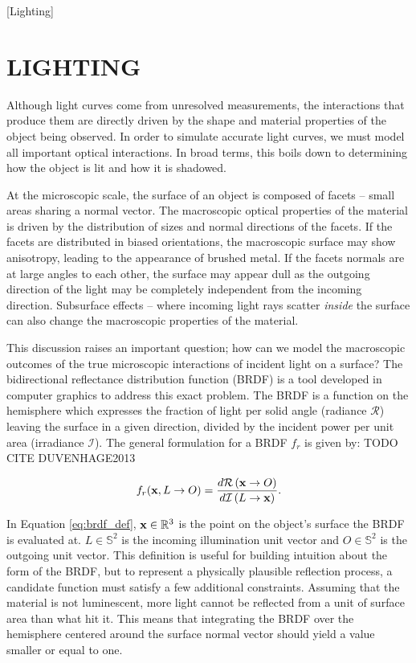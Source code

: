 [Lighting]
\graphicspath{{../PyLightCurves/docs/source/gallery/01-light_curves/images}}

\chapter{LIGHTING}

Although light curves come from unresolved measurements, the interactions that produce them are directly driven by the shape and material properties of the object being observed. In order to simulate accurate light curves, we must model all important optical interactions. In broad terms, this boils down to determining how the object is lit and how it is shadowed. 

At the microscopic scale, the surface of an object is composed of facets -- small areas sharing a normal vector. The macroscopic optical properties of the material is driven by the distribution of sizes and normal directions of the facets. If the facets are distributed in biased orientations, the macroscopic surface may show anisotropy, leading to the appearance of brushed metal. If the facets normals are at large angles to each other, the surface may appear dull as the outgoing direction of the light may be completely independent from the incoming direction. Subsurface effects -- where incoming light rays scatter \textit{inside} the surface can also change the macroscopic properties of the material. 

This discussion raises an important question; how can we model the macroscopic outcomes of the true microscopic interactions of incident light on a surface? The bidirectional reflectance distribution function (BRDF) is a tool developed in computer graphics to address this exact problem. The BRDF is a function on the hemisphere which expresses the fraction of light per solid angle (radiance $\mathcal{R}$) leaving the surface in a given direction, divided by the incident power per unit area (irradiance $\mathcal{I}$). The general formulation for a BRDF $f_r$ is given by: TODO CITE DUVENHAGE2013

\begin{equation}
    f_r(\mathbf{x}, L \rightarrow O) = \frac{d\mathcal{R}\left(\mathbf{x} \rightarrow O\right)}{d\mathcal{I}\left(L \rightarrow \mathbf{x}\right)}.
    \label{eq:brdf_def}
\end{equation}

In Equation \ref{eq:brdf_def}, $\mathbf{x} \in \mathbb{R}^3$ is the point on the object's surface the BRDF is evaluated at. $L \in \mathbb{S}^2$ is the incoming illumination unit vector and $O \in \mathbb{S}^2$ is the outgoing unit vector. This definition is useful for building intuition about the form of the BRDF, but to represent a physically plausible reflection process, a candidate function must satisfy a few additional constraints. Assuming that the material is not luminescent, more light cannot be reflected from a unit of surface area than what hit it. This means that integrating the BRDF over the hemisphere centered around the surface normal vector should yield a value smaller or equal to one.

